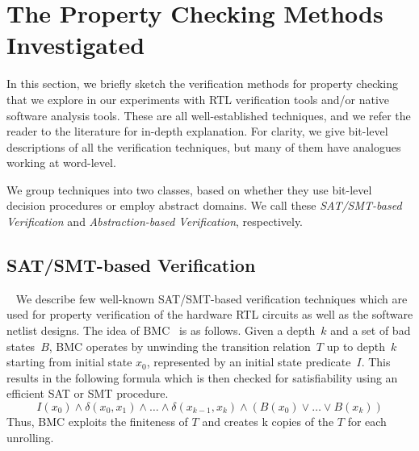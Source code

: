 \section{The Property Checking Methods Investigated}\label{sec:techniques}

In this section, we briefly sketch the verification methods for property checking that
we explore in our experiments with RTL verification tools and/or
native software analysis tools. These are all well-established techniques, 
and we refer the reader to the literature for in-depth explanation.
For clarity, we give bit-level descriptions of all 
the verification techniques, but many of them have analogues working at
word-level.

We group techniques into two classes, based on whether 
they use bit-level decision procedures or employ abstract domains. We call these \textit{SAT/SMT-based
Verification} and \textit{Abstraction-based Verification}, respectively.



\subsection{SAT/SMT-based Verification}~\label{netlist-verif}
%
We describe few well-known SAT/SMT-based verification techniques which are 
used for property verification of the hardware RTL circuits as well as the 
software netlist designs. 
%
%
The idea of BMC~\cite{biere} is as follows. 
Given a depth~$k$ and a set of bad states~$B$, BMC operates
by unwinding the transition relation~$T$ up to depth~$k$ starting from
initial state $x_0$, represented by an initial state predicate~$I$.
This results in the following formula which is then checked for
satisfiability using an efficient SAT or SMT procedure.
%
\[ I(x_0) \wedge \delta(x_0, x_1) \wedge \ldots 
   \wedge \delta(x_{k-1}, x_k) \wedge (B(x_0) \vee \ldots \vee B(x_k)) \]
%
Thus, BMC exploits the finiteness of $T$ and creates k copies of the
$T$ for each unrolling.


